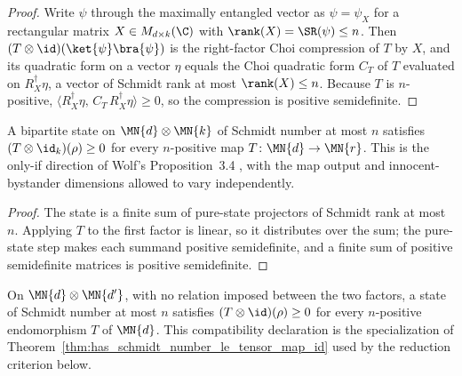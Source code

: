 \begin{proof}
    \leanok
    Write $\psi$ through the maximally entangled vector as $\psi=\psi_X$ for a
    rectangular matrix $X\in M_{d\times k}(\C)$ with
    $\rank(X)=\SR(\psi)\le n$. Then
    $(T\otimes\id)(\ket{\psi}\bra{\psi})$ is the right-factor Choi compression of $T$
    by $X$, and its quadratic form on a vector $\eta$ equals the Choi quadratic form
    $C_T$ of $T$ evaluated on $R_X^\dagger\eta$, a vector of Schmidt rank at most
    $\rank(X)\le n$. Because $T$ is $n$-positive,
    $\langle R_X^\dagger\eta,\, C_T\, R_X^\dagger\eta\rangle\ge 0$, so the
    compression is positive semidefinite.
\end{proof}

\begin{theorem}
    \label{thm:has_schmidt_number_le_tensor_map_id}
    \leanok
    A bipartite state on $\MN{d}\otimes\MN{k}$ of Schmidt number at most $n$
    satisfies $(T\otimes\id_k)(\rho)\ge 0$ for every $n$-positive map
    $T\colon\MN{d}\to\MN{r}$. This is the only-if direction of Wolf's
    Proposition~3.4 \cite[Chapter~3, Proposition~3.4]{Wolf2012Quantum}, with the
    map output and innocent-bystander dimensions allowed to vary independently.
\end{theorem}

\begin{proof}
    \leanok
    The state is a finite sum of pure-state projectors of Schmidt rank at most $n$.
    Applying $T$ to the first factor is linear, so it distributes over the sum; the
    pure-state step makes each summand positive semidefinite, and a finite sum of
    positive semidefinite matrices is positive semidefinite.
\end{proof}

\begin{theorem}
    \label{thm:has_schmidt_number_le_tensor_map_id_general}
    \leanok
    On $\MN{d}\otimes\MN{d'}$, with no relation imposed between the two factors, a
    state of Schmidt number at most $n$ satisfies $(T\otimes\id)(\rho)\ge 0$ for
    every $n$-positive endomorphism $T$ of $\MN{d}$. This compatibility declaration
    is the specialization of Theorem~\ref{thm:has_schmidt_number_le_tensor_map_id}
    used by the reduction criterion below.
\end{theorem}

